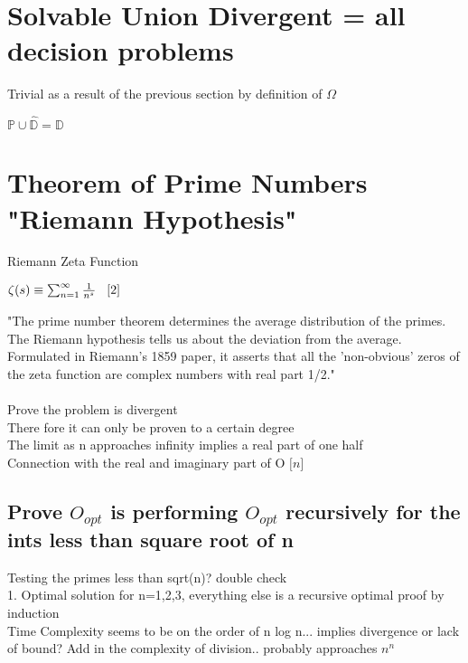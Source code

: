 \documentclass[11pt]{article}
\begin{document}
\section{Solvable Union Divergent = all decision problems}
Trivial as a result of the previous section by definition of $\Omega$
\begin{center}
$\mathbb{P} \cup \hat{\mathbb{D}} = \mathbb{D}$
\end{center}





\newpage
\section{Theorem of Prime Numbers "Riemann Hypothesis"}
Riemann Zeta Function
\begin{center}
$
\zeta (s) \equiv \sum_{n=1}^{\infty} \frac{1}{n^s} \hspace{3mm} \lbrack 2 \rbrack
$
\end{center}
"The prime number theorem determines the average distribution of the primes. The Riemann hypothesis tells us about the deviation from the average. Formulated in Riemann's 1859 paper, it asserts that all the 'non-obvious' zeros of the zeta function are complex numbers with real part 1/2." \rbrack\\
\\
Prove the problem is divergent\\
There fore it can only be proven to a certain degree\\
The limit as n approaches infinity implies a real part of one half\\
Connection with the real and imaginary part of O $\lbrack n \rbrack$

\subsection{Prove $O_{opt}$ is performing $O_{opt}$ recursively for the ints less than square root of n}
Testing the primes less than sqrt(n)? double check \\
1. Optimal solution for n=1,2,3, everything else is a recursive optimal proof by induction\\
Time Complexity seems to be on the order of n log n... implies divergence or lack of bound? Add in the complexity of division.. probably approaches $n^n$

\end{document}
